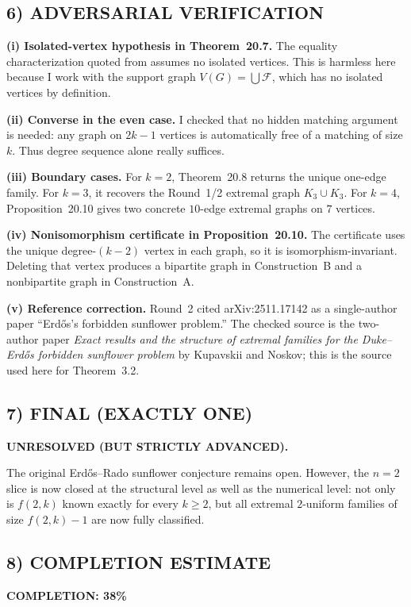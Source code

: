 \subsection{6) ADVERSARIAL VERIFICATION}
\textbf{(i) Isolated-vertex hypothesis in Theorem~20.7.}
The equality characterization quoted from \cite{KupavskiiNoskov2025} assumes no isolated vertices. This is harmless here because I work with the support graph $V(G)=\bigcup\mathcal F$, which has no isolated vertices by definition.

\textbf{(ii) Converse in the even case.}
I checked that no hidden matching argument is needed: any graph on $2k-1$ vertices is automatically free of a matching of size $k$. Thus degree sequence alone really suffices.

\textbf{(iii) Boundary cases.}
For $k=2$, Theorem~20.8 returns the unique one-edge family. For $k=3$, it recovers the Round~1/2 extremal graph $K_3\cup K_3$. For $k=4$, Proposition~20.10 gives two concrete $10$-edge extremal graphs on $7$ vertices.

\textbf{(iv) Nonisomorphism certificate in Proposition~20.10.}
The certificate uses the unique degree-$(k-2)$ vertex in each graph, so it is isomorphism-invariant. Deleting that vertex produces a bipartite graph in Construction~B and a nonbipartite graph in Construction~A.

\textbf{(v) Reference correction.}
Round~2 cited arXiv:2511.17142 as a single-author paper ``Erd\H{o}s's forbidden sunflower problem.'' The checked source is the two-author paper \emph{Exact results and the structure of extremal families for the Duke--Erd\H{o}s forbidden sunflower problem} by Kupavskii and Noskov; this is the source used here for Theorem~3.2.

\subsection{7) FINAL (EXACTLY ONE)}
\textbf{UNRESOLVED (BUT STRICTLY ADVANCED).}

The original Erd\H{o}s--Rado sunflower conjecture remains open. However, the $n=2$ slice is now closed at the structural level as well as the numerical level: not only is $f(2,k)$ known exactly for every $k\ge 2$, but all extremal $2$-uniform families of size $f(2,k)-1$ are now fully classified.

\subsection{8) COMPLETION ESTIMATE}
\noindent\textbf{COMPLETION: 38\%}

